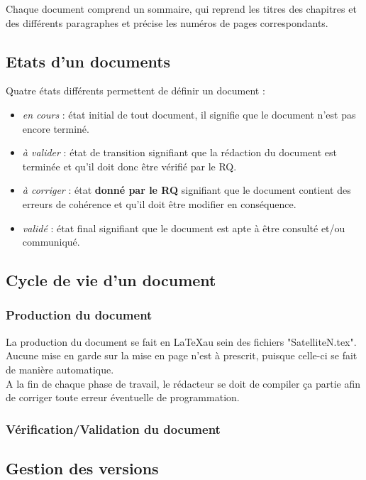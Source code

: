       Chaque document comprend un sommaire, qui reprend les titres des chapitres et des différents paragraphes et précise les numéros de pages correspondants.
  
   
  \subsection{Etats d'un documents}
  
    Quatre états différents permettent de définir un document :
    \begin{itemize}
      \item \textit{en cours} : état initial de tout document, il signifie que le document n'est pas encore terminé.
      \item \textit{à valider} : état de transition signifiant que la rédaction du document est terminée et qu'il doit donc être vérifié par le RQ.
      \item \textit{à corriger} : état \textbf{donné par le RQ} signifiant que le document contient des erreurs de cohérence et qu'il doit être modifier en conséquence.
      \item \textit{validé} : état final signifiant que le document est apte à être consulté et/ou communiqué.
    \end{itemize}
  
  \subsection{Cycle de vie d'un document}
    \subsubsection{Production du document}
      La production du document se fait en \LaTeX au sein des fichiers "SatelliteN.tex".\\ Aucune mise en garde sur la mise en page n'est à
      prescrit, puisque celle-ci se fait de manière automatique.\\ A la fin de chaque phase de travail, le rédacteur se doit de compiler ça partie
      afin de corriger toute erreur éventuelle de programmation.
    \subsubsection{Vérification/Validation du document}
    
  \subsection{Gestion des versions}
  

